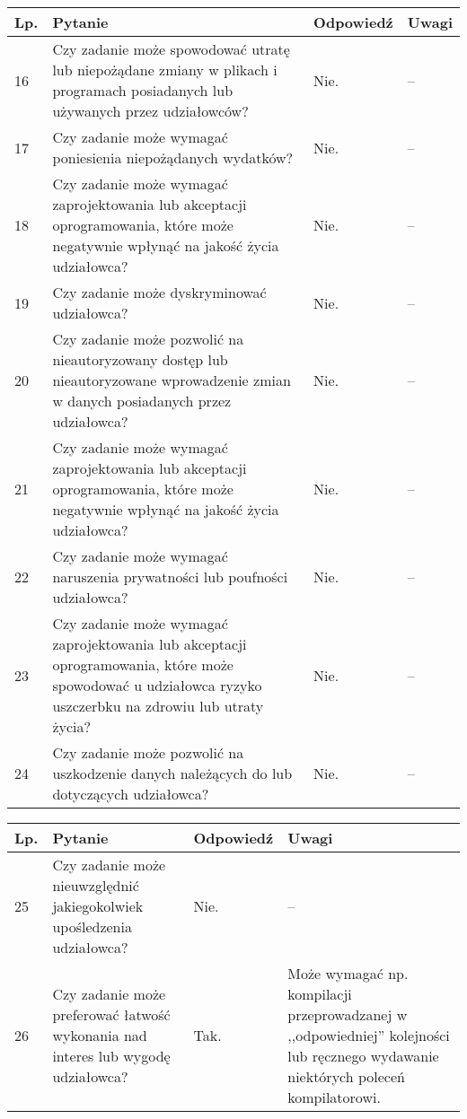 \documentclass[11pt,oneside,a4paper,titlepage,onecolumn]{article}
\begin{document}
\begin{tabularx}{\textwidth}{|l|X|l|X|}
    \hline
    Lp. & Pytanie & Odpowiedź & Uwagi \\ \hline
    
	16
	& Czy zadanie może spowodować utratę lub niepożądane zmiany w plikach i
    programach posiadanych lub używanych przez udziałowców?
	& Nie.
	& --
	\\\hline
	
	17
	& Czy zadanie może wymagać poniesienia niepożądanych wydatków?
	& Nie.
	& --
	\\\hline
	
	18
	& Czy zadanie może wymagać zaprojektowania lub akceptacji oprogramowania,
    które może negatywnie wpłynąć na jakość życia udziałowca?
	& Nie.
	& --
	\\\hline
	
	19
	& Czy zadanie może dyskryminować udziałowca?
	& Nie.
	& --
	\\\hline
	
	20
	& Czy zadanie może pozwolić na nieautoryzowany dostęp lub nieautoryzowane
    wprowadzenie zmian w danych posiadanych przez udziałowca?
	& Nie.
	& --
	\\\hline
	
	21
	& Czy zadanie może wymagać zaprojektowania lub akceptacji oprogramowania,
    które może negatywnie wpłynąć na jakość życia udziałowca?
	& Nie.
	& --
	\\\hline
	
	22
	& Czy zadanie może wymagać naruszenia prywatności lub poufności udziałowca?
	& Nie.
	& --
	\\\hline
	
	23
	& Czy zadanie może wymagać zaprojektowania lub akceptacji oprogramowania,
    które może spowodować u udziałowca ryzyko uszczerbku na zdrowiu lub utraty
    życia?
	& Nie.
	& --
	\\\hline
	
	24
	& Czy zadanie może pozwolić na uszkodzenie danych należących do lub
    dotyczących udziałowca?
	& Nie.
	& --
	\\\hline
\end{tabularx}

\begin{tabularx}{\textwidth}{|l|X|l|X|}
    \hline
    Lp. & Pytanie & Odpowiedź & Uwagi \\ \hline
    
	25
	& Czy zadanie może nieuwzględnić jakiegokolwiek upośledzenia udziałowca?
	& Nie.
	& --
	\\\hline
    
	26
	& Czy zadanie może preferować łatwość wykonania nad interes lub wygodę
    udziałowca?
	& Tak.
	& Może wymagać np. kompilacji przeprowadzanej w ,,odpowiedniej'' kolejności
    lub ręcznego wydawanie niektórych poleceń kompilatorowi.
	\\\hline
\end{tabularx}
\end{document}
